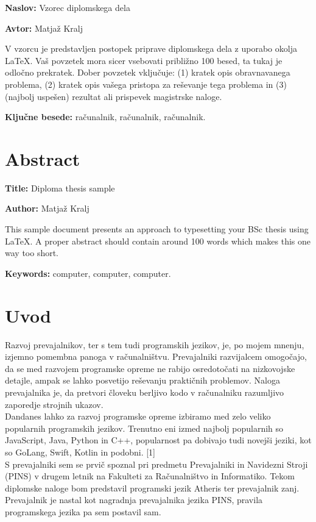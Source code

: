\documentclass[a4paper, 12pt]{book}
\newcommand{\ttitle}{Vzorec diplomskega dela}
\newcommand{\ttitleEn}{Diploma thesis sample}
\newcommand{\tauthor}{Matjaž Kralj}
\newcommand{\tkeywords}{računalnik, računalnik, računalnik}
\newcommand{\tkeywordsEn}{computer, computer, computer}
\newcommand{\clearemptydoublepage}{\newpage{\pagestyle{empty}\cleardoublepage}}
\begin{document}
\noindent\textbf{Naslov:} \ttitle
\bigskip

\noindent\textbf{Avtor:} \tauthor
\bigskip

\noindent V vzorcu je predstavljen postopek priprave diplomskega dela z uporabo okolja \LaTeX. Vaš povzetek mora sicer vsebovati približno 100 besed, ta tukaj je odločno prekratek.
Dober povzetek vključuje: (1) kratek opis obravnavanega problema, (2) kratek opis vašega pristopa za reševanje tega problema in (3) (najbolj uspešen) rezultat ali prispevek magistrske naloge.

\bigskip

\noindent\textbf{Ključne besede:} \tkeywords.
\clearemptydoublepage

\chapter*{Abstract}

\noindent\textbf{Title:} \ttitleEn
\bigskip

\noindent\textbf{Author:} \tauthor
\bigskip

\noindent This sample document presents an approach to typesetting your BSc thesis using \LaTeX. 
A proper abstract should contain around 100 words which makes this one way too short.
\bigskip

\noindent\textbf{Keywords:} \tkeywordsEn.
\clearemptydoublepage

\mainmatter
\setcounter{page}{1}
\pagestyle{fancy}

\chapter{Uvod}

Razvoj prevajalnikov, ter s tem tudi programskih jezikov, je, po mojem mnenju, izjemno pomembna panoga v računalništvu. Prevajalniki razvijalcem omogočajo, da se med razvojem programske opreme ne rabijo osredotočati na nizkovojske detajle, ampak se lahko posvetijo reševanju praktičnih problemov. Naloga prevajalnika je, da pretvori človeku berljivo kodo v računalniku razumljivo zaporedje strojnih ukazov. \\
Dandanes lahko za razvoj programske opreme izbiramo med zelo veliko popularnih programskih jezikov. Trenutno eni izmed najbolj popularnih so JavaScript, Java, Python in C++, popularnost pa dobivajo tudi novejši jeziki, kot so GoLang, Swift, Kotlin in podobni. [1] \\
S prevajalniki sem se prvič spoznal pri predmetu Prevajalniki in Navidezni Stroji (PINS) v drugem letnik na Fakulteti za Računalništvo in Informatiko. Tekom diplomske naloge bom predstavil programski jezik Atheris ter prevajalnik zanj. Prevajalnik je nastal kot nagradnja prevajalnika jezika PINS, pravila programskega jezika pa sem postavil sam.
\end{document}
